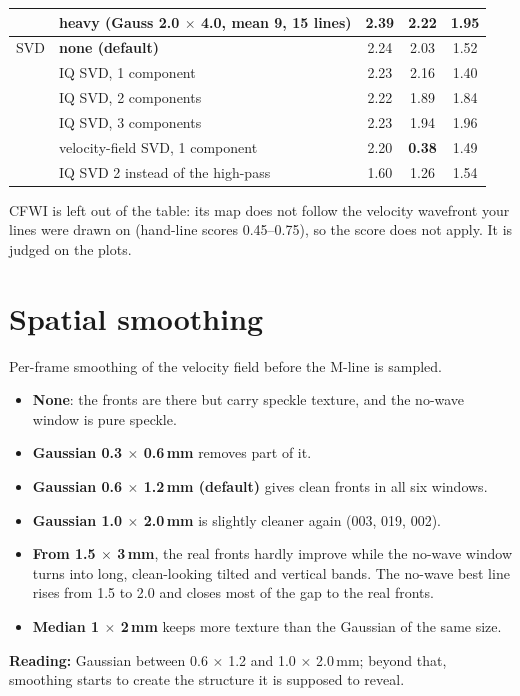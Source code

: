 \documentclass[10pt]{article}
\begin{document}
\begin{center}
\begin{tabular}{llccc}
 & heavy (Gauss 2.0 $\times$ 4.0, mean 9, 15 lines) & 2.39 & 2.22 & 1.95 \\
\midrule
SVD & \textbf{none (default)} & 2.24 & 2.03 & 1.52 \\
 & IQ SVD, 1 component & 2.23 & 2.16 & 1.40 \\
 & IQ SVD, 2 components & 2.22 & 1.89 & 1.84 \\
 & IQ SVD, 3 components & 2.23 & 1.94 & 1.96 \\
 & velocity-field SVD, 1 component & 2.20 & \textbf{0.38} & 1.49 \\
 & IQ SVD 2 instead of the high-pass & 1.60 & 1.26 & 1.54 \\
\bottomrule
\end{tabular}
\end{center}

CFWI is left out of the table: its map does not follow the velocity wavefront your lines were
drawn on (hand-line scores 0.45--0.75), so the score does not apply. It is judged on the plots.

\clearpage
\section{Spatial smoothing}

Per-frame smoothing of the velocity field before the M-line is sampled.
\begin{itemize}
  \item \textbf{None}: the fronts are there but carry speckle texture, and the no-wave window is
    pure speckle.
  \item \textbf{Gaussian 0.3 $\times$ 0.6\,mm} removes part of it.
  \item \textbf{Gaussian 0.6 $\times$ 1.2\,mm (default)} gives clean fronts in all six windows.
  \item \textbf{Gaussian 1.0 $\times$ 2.0\,mm} is slightly cleaner again (003, 019, 002).
  \item \textbf{From 1.5 $\times$ 3\,mm}, the real fronts hardly improve while the no-wave window
    turns into long, clean-looking tilted and vertical bands. The no-wave best line rises from
    1.5 to 2.0 and closes most of the gap to the real fronts.
  \item \textbf{Median 1 $\times$ 2\,mm} keeps more texture than the Gaussian of the same size.
\end{itemize}
\textbf{Reading:} Gaussian between 0.6 $\times$ 1.2 and 1.0 $\times$ 2.0\,mm; beyond that,
smoothing starts to create the structure it is supposed to reveal.
\end{document}
